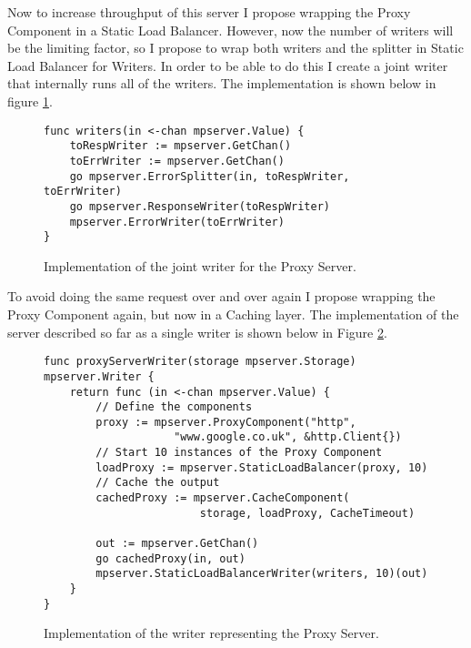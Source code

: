 Now to increase throughput of this server I propose wrapping the Proxy
Component in a Static Load Balancer. However, now the number of writers
will be the limiting factor, so I propose to wrap both writers and 
the splitter in Static Load Balancer for Writers. In order to be able 
to do this I create a joint writer that internally runs all of the writers.
The implementation is shown below in figure \ref{fig:ProxyWriters}.
\begin{figure}[h]
\begin{lstlisting}
func writers(in <-chan mpserver.Value) {
    toRespWriter := mpserver.GetChan()
    toErrWriter := mpserver.GetChan()
    go mpserver.ErrorSplitter(in, toRespWriter, toErrWriter)
    go mpserver.ResponseWriter(toRespWriter)
    mpserver.ErrorWriter(toErrWriter)
}    
\end{lstlisting}
\caption[scale=1.0]{Implementation of the joint writer for the Proxy Server.}
\label{fig:ProxyWriters}
\end{figure}

To avoid doing the same request over and over again I propose
wrapping the Proxy Component again, but now in a Caching layer. The 
implementation of the server described so far as a single writer is shown
below in Figure \ref{fig:ProxyWriter}.
\begin{figure}[h]
\begin{lstlisting}
func proxyServerWriter(storage mpserver.Storage) mpserver.Writer {
    return func (in <-chan mpserver.Value) {
        // Define the components
        proxy := mpserver.ProxyComponent("http", 
                    "www.google.co.uk", &http.Client{})
        // Start 10 instances of the Proxy Component
        loadProxy := mpserver.StaticLoadBalancer(proxy, 10)
        // Cache the output
        cachedProxy := mpserver.CacheComponent(
                        storage, loadProxy, CacheTimeout)

        out := mpserver.GetChan()
        go cachedProxy(in, out)
        mpserver.StaticLoadBalancerWriter(writers, 10)(out)
    }
}  
\end{lstlisting}
\caption[scale=1.0]{Implementation of the writer representing the Proxy Server.}
\label{fig:ProxyWriter}
\end{figure}

